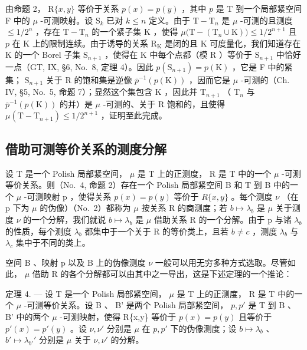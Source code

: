 由命题 2， \(\mathrm{R}\{x,y\}\) 等价于关系 \(p(x)=p(y)\) ，其中 \(p\) 是 T 到一个局部紧空间 F 中的 \(\mu\) -可测映射。设 \(\mathrm{S}_{k}\) 已对 \(k\leqslant n\) 定义。由于 \(\mathrm{T}-\mathrm{T}_{n}\) 是 \(\mu\) -可测的且测度 \(\leqslant 1/2^{n}\) ，存在 \(\mathrm{T}-\mathrm{T}_{n}\) 的一个紧子集 K ，使得 \(\mu\big(\mathrm{T}-(\mathrm{T}_{n}\cup\mathrm{K})\big)\leqslant 1/2^{n+1}\) 且 \(p\) 在 K 上的限制连续。由于诱导的关系 \(\mathrm{R}_{\mathrm{K}}\) 是闭的且 K 可度量化，我们知道存在 K 的一个 Borel 子集 \(\mathrm{S}_{n+1}\) ，使得在 K 中每个点都（模 R ）等价于 \(\mathrm{S}_{n+1}\) 中恰好一点（GT, IX, §6, No.~8, 定理 4）。因此 \(p(\mathrm{S}_{n+1})=p(\mathrm{K})\) ，它是 F 中的紧集； \(\mathrm{S}_{n+1}\) 关于 R 的饱和集是逆像 \(\overline{p}^{-1}(p(\mathrm{K}))\) ，因而它是 \(\mu\) -可测的（Ch. IV, §5, No.~5, 命题 7）；显然这个集包含 K ，因此并 \(\mathrm{T}_{n+1}\) （ \(\mathrm{T}_n\) 与 \(\overline{p}^{-1}(p(\mathrm{K}))\) 的并）是 \(\mu\) -可测的、关于 R 饱和的，且使得 \(\mu(\mathrm{T} - \mathrm{T}_{n+1}) \leqslant 1/2^{n+1}\) ，证明至此完成。

\subsection{借助可测等价关系的测度分解}

设 T 是一个 Polish 局部紧空间， \(\mu\) 是 T 上的正测度， R 是 T 中的一个 \(\mu\) -可测等价关系。则（No.~4, 命题 2）存在一个 Polish 局部紧空间 B 和 T 到 B 中的一个 \(\mu\) -可测映射 p ，使得关系 \(p(x) = p(y)\) 等价于 \(R\{x, y\}\) 。每个测度 \(\nu\) （在 p 下为 \(\mu\) 的伪像）（No.~2）都称为 \(\mu\) 按关系 R 的商测度；若 \(b \mapsto \lambda_b\) 是 \(\mu\) 关于测度 \(\nu\) 的一个分解，我们就说 \(b \mapsto \lambda_b\) 是 \(\mu\) 借助关系 R 的一个分解。由于 p 与诸 \(\lambda_b\) 的性质，每个测度 \(\lambda_b\) 都集中于一个关于 R 的等价类上，且若 \(b \neq c\) ，测度 \(\lambda_b\) 与 \(\lambda_c\) 集中于不同的类上。

空间 B 、映射 p 以及 B 上的伪像测度 \(\nu\) 一般可以用无穷多种方式选取。尽管如此， \(\mu\) 借助 R 的各个分解都可以由其中之一导出，这是下述定理的一个推论：

定理 4. --- 设 T 是一个 Polish 局部紧空间， \(\mu\) 是 T 上的正测度， R 是 T 中的一个 \(\mu\) -可测等价关系。设 B 、 B' 是两个 Polish 局部紧空间， \(p, p'\) 是 T 到 B 、 B' 中的两个 \(\mu\) -可测映射，使得 R\{x,y\} 等价于 \(p(x) = p(y)\) 且等价于 \(p'(x) = p'(y)\) 。设 \(\nu, \nu'\) 分别是 \(\mu\) 在 \(p, p'\) 下的伪像测度；设 \(b \mapsto \lambda_b\) 、 \(b' \mapsto \lambda_{b'}'\) 分别是 \(\mu\) 关于 \(\nu, \nu'\) 的分解。

